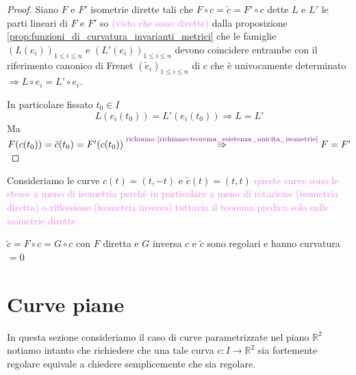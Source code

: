 \begin{proof}
        Siano $F$ e $F'$ isometrie dirette tali che $F \circ c = \tilde{c} = F' \circ c$ dette $L$ e $L'$ le parti lineari di $F$ e $F'$ so 
        \textcolor{violet}{(visto che sono dirette)} dalla proposizione 
        \ref{prop:funzioni_di_curvatura_invarianti_metrici} che le famiglie 
        $\left(L(e_i)\right)_{1 \leq i \leq n}$ e $\left(L'(e_i)\right)_{1 \leq i \leq n}$ devono coincidere entrambe con il riferimento 
        canonico di Frenet $\left(\tilde{e}_i\right)_{1 \leq i \leq n}$ di $c$ che è univocamente determinato $\Rightarrow L \circ e_i = L' \circ e_i$.

        In particolare fissato $t_0 \in I$
        \[ L(e_i(t_0)) = L'(e_i(t_0)) \Rightarrow L = L' \]
        Ma $F(c(t_0)) = \tilde{c}(t_0) = F'(c(t_0)) \overset{\textcolor{violet}{ \substack{\text{richiamo \ref{richiamo:teorema_esistenza_unicita_isometrie}} }}}{\Rightarrow} F = F'$
        \end{proof}
        \begin{esempio}
        Consideriamo le curve $c(t)=(t,-t)$ e $\tilde{c}(t)=(t,t)$ \textcolor{violet}{queste curve sono le stesse a meno di isometria perché 
        in particolare a meno di rotazione (isometria diretta) o riflessione (isometria inversa) tuttavia il teorema predica solo sulle isometrie dirette}
        \begin{center}
        \end{center}
        $\tilde{c}= F \circ c = G \circ c$ con $F$ diretta e $G$ inversa 
        $c$ e $\tilde{c}$ sono regolari e hanno curvatura $=0$
        \end{esempio}
    \section{Curve piane}
        In questa sezione consideriamo il caso di curve parametrizzate nel piano $\mathbb{R}^2$ notiamo intanto che richiedere che una tale curva $c \colon I \to \mathbb{R}^2$ sia 
        fortemente regolare equivale a chiedere semplicemente che sia regolare.

